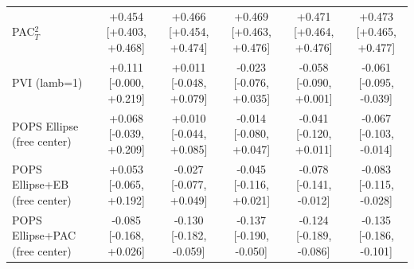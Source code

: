 \begin{tabular}{lccccc}
PAC$^2_T$ & +0.454 {\scriptsize[+0.403, +0.468]} & +0.466 {\scriptsize[+0.454, +0.474]} & +0.469 {\scriptsize[+0.463, +0.476]} & +0.471 {\scriptsize[+0.464, +0.476]} & +0.473 {\scriptsize[+0.465, +0.477]} \\
PVI (lamb=1) & +0.111 {\scriptsize[-0.000, +0.219]} & +0.011 {\scriptsize[-0.048, +0.079]} & -0.023 {\scriptsize[-0.076, +0.035]} & -0.058 {\scriptsize[-0.090, +0.001]} & -0.061 {\scriptsize[-0.095, -0.039]} \\
POPS Ellipse (free center) & +0.068 {\scriptsize[-0.039, +0.209]} & +0.010 {\scriptsize[-0.044, +0.085]} & -0.014 {\scriptsize[-0.080, +0.047]} & -0.041 {\scriptsize[-0.120, +0.011]} & -0.067 {\scriptsize[-0.103, -0.014]} \\
POPS Ellipse+EB (free center) & +0.053 {\scriptsize[-0.065, +0.192]} & -0.027 {\scriptsize[-0.077, +0.049]} & -0.045 {\scriptsize[-0.116, +0.021]} & -0.078 {\scriptsize[-0.141, -0.012]} & -0.083 {\scriptsize[-0.115, -0.028]} \\
POPS Ellipse+PAC (free center) & -0.085 {\scriptsize[-0.168, +0.026]} & -0.130 {\scriptsize[-0.182, -0.059]} & -0.137 {\scriptsize[-0.190, -0.050]} & -0.124 {\scriptsize[-0.189, -0.086]} & -0.135 {\scriptsize[-0.186, -0.101]} \\
\bottomrule
\end{tabular}

